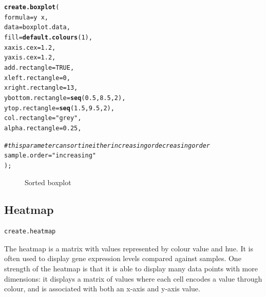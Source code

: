 \documentclass[letterpaper]{article}\usepackage[]{graphicx}\usepackage[]{color}
\makeatletter
\newcommand{\hlnum}[1]{\textcolor[rgb]{0.686,0.059,0.569}{#1}}%
\newcommand{\hlstr}[1]{\textcolor[rgb]{0.192,0.494,0.8}{#1}}%
\newcommand{\hlcom}[1]{\textcolor[rgb]{0.678,0.584,0.686}{\textit{#1}}}%
\newcommand{\hlopt}[1]{\textcolor[rgb]{0,0,0}{#1}}%
\newcommand{\hlstd}[1]{\textcolor[rgb]{0.345,0.345,0.345}{#1}}%
\newcommand{\hlkwc}[1]{\textcolor[rgb]{0.333,0.667,0.333}{#1}}%
\newcommand{\hlkwd}[1]{\textcolor[rgb]{0.737,0.353,0.396}{\textbf{#1}}}%
\newenvironment{kframe}{%
 \def\at@end@of@kframe{}%
 \ifinner\ifhmode%
  \def\at@end@of@kframe{\end{minipage}}%
  \begin{minipage}{\columnwidth}%
 \fi\fi%
 \def\FrameCommand##1{\hskip\@totalleftmargin \hskip-\fboxsep
 \colorbox{shadecolor}{##1}\hskip-\fboxsep
     \hskip-\linewidth \hskip-\@totalleftmargin \hskip\columnwidth}%
 \MakeFramed {\advance\hsize-\width
   \@totalleftmargin\z@ \linewidth\hsize
   \@setminipage}}%
 {\par\unskip\endMakeFramed%
 \at@end@of@kframe}
\newenvironment{knitrout}{}{} %
\makeatother
\begin{document}
\begin{knitrout}
\color{fgcolor}\begin{kframe}
\begin{alltt}
\hlkwd{create.boxplot}\hlstd{(}
    \hlkwc{formula} \hlstd{= y} \hlopt{~} \hlstd{x,}
    \hlkwc{data} \hlstd{= boxplot.data,}
    \hlkwc{fill} \hlstd{=} \hlkwd{default.colours}\hlstd{(}\hlnum{1}\hlstd{),}
    \hlkwc{xaxis.cex} \hlstd{=} \hlnum{1.2}\hlstd{,}
    \hlkwc{yaxis.cex} \hlstd{=} \hlnum{1.2}\hlstd{,}
    \hlkwc{add.rectangle} \hlstd{=} \hlnum{TRUE}\hlstd{,}
    \hlkwc{xleft.rectangle} \hlstd{=} \hlnum{0}\hlstd{,}
    \hlkwc{xright.rectangle} \hlstd{=} \hlnum{13}\hlstd{,}
    \hlkwc{ybottom.rectangle} \hlstd{=} \hlkwd{seq}\hlstd{(}\hlnum{0.5}\hlstd{,} \hlnum{8.5}\hlstd{,} \hlnum{2}\hlstd{),}
    \hlkwc{ytop.rectangle} \hlstd{=} \hlkwd{seq}\hlstd{(}\hlnum{1.5}\hlstd{,} \hlnum{9.5}\hlstd{,} \hlnum{2}\hlstd{),}
    \hlkwc{col.rectangle} \hlstd{=} \hlstr{"grey"}\hlstd{,}
    \hlkwc{alpha.rectangle} \hlstd{=} \hlnum{0.25}\hlstd{,}

    \hlcom{# this parameter can sort in either increasing or decreasing order}
    \hlkwc{sample.order} \hlstd{=} \hlstr{"increasing"}
    \hlstd{);}
\end{alltt}
\end{kframe}\begin{figure}[]


{\centering {} 

}

\caption[Sorted boxplot]{Sorted boxplot\label{fig:boxplot4}}
\end{figure}


\end{knitrout}

\subsection{Heatmap}
\begin{verbatim}
create.heatmap
\end{verbatim}

The heatmap is a matrix with values represented by colour value and hue. It is often used to display gene expression levels compared against samples. One strength of the heatmap is that it is able to display many data points with more dimensions: it displays a matrix of values where each cell encodes a value through colour, and is associated with both an x-axis and y-axis value. 
\end{document}
